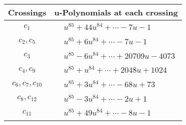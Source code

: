 \documentclass[1p]{elsarticle_modified}
\theoremstyle{definition}
\begin{document}
\begin{tabular}{m{50pt}|m{274pt}}
Crossings & \hspace{64pt}u-Polynomials at each crossing \\
\hline $$\begin{aligned}c_{1}\end{aligned}$$&$\begin{aligned}
&u^{85}+44 u^{84}+\cdots-7 u-1
\end{aligned}$\\
\hline $$\begin{aligned}c_{2},c_{5}\end{aligned}$$&$\begin{aligned}
&u^{85}+6 u^{84}+\cdots-7 u-1
\end{aligned}$\\
\hline $$\begin{aligned}c_{3}\end{aligned}$$&$\begin{aligned}
&u^{85}-6 u^{84}+\cdots+20709 u-4073
\end{aligned}$\\
\hline $$\begin{aligned}c_{4},c_{9}\end{aligned}$$&$\begin{aligned}
&u^{85}+u^{84}+\cdots+2048 u+1024
\end{aligned}$\\
\hline $$\begin{aligned}c_{6},c_{7},c_{10}\end{aligned}$$&$\begin{aligned}
&u^{85}+3 u^{84}+\cdots-68 u+73
\end{aligned}$\\
\hline $$\begin{aligned}c_{8},c_{12}\end{aligned}$$&$\begin{aligned}
&u^{85}-3 u^{84}+\cdots-2 u+1
\end{aligned}$\\
\hline $$\begin{aligned}c_{11}\end{aligned}$$&$\begin{aligned}
&u^{85}+49 u^{84}+\cdots-8 u-1
\end{aligned}$\\
\hline
\end{tabular}\\~\\
\newpage\renewcommand{\arraystretch}{1}
\end{document}

